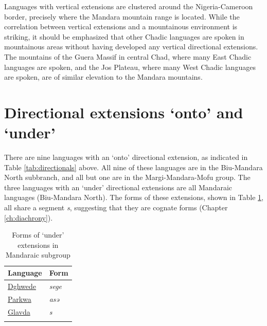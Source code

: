 Languages with vertical extensions are clustered around the Nigeria-Came\-roon border, precisely where the Mandara mountain range is located. While the correlation between vertical extensions and a mountainous environment is striking, it should be emphasized that other Chadic languages are spoken in mountainous areas without having developed any vertical directional extensions. The mountains of the Guera Massif in central Chad, where many East Chadic languages are spoken, and the Jos Plateau, where many West Chadic languages are spoken, are of similar elevation to the Mandara mountains.


\section{Directional extensions `onto' and `under'}  \label{sec:onto2}

There are nine languages with an `onto' directional extension, as indicated in Table \ref{tab:directionals} above. All nine of these languages are in the Biu-Mandara North subbranch, and all but one are in the Margi-Mandara-Mofu group. The three languages with an `under' directional extensions are all Mandaraic languages (Biu-Mandara North). The forms of these extensions, shown in Table \ref{tab:under}, all share a segment \textit{s}, suggesting that they are cognate forms (Chapter \ref{ch:diachrony}).



\begin{table}
	\caption{Forms of `under' extensions in Mandaraic subgroup}
	\label{tab:under}
	\begin{tabular}{ll}
		\lsptoprule
	Language	&     Form    \\ %
		\midrule
		\hyperref[dghw]{Dghwede} & \textit{sege} \\ %
		\hyperref[park]{Parkwa}	 & \textit{asə} \\ %
		\hyperref[glav]{Glavda} &	\textit{s}	\\ %
		\lspbottomrule
	\end{tabular}
\end{table}

